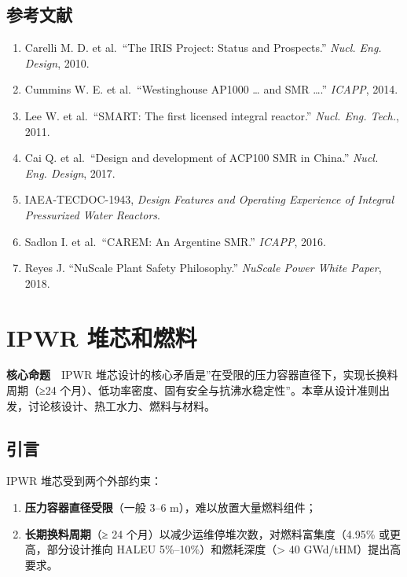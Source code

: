 \documentclass[
  UTF8,
  scheme=plain,
  fontsize=10pt,
  openany
]{ctexbook}
\begin{document}
\section{参考文献}\label{ux53c2ux8003ux6587ux732e-2}

\begin{enumerate}
\def\labelenumi{\arabic{enumi}.}
\tightlist
\item
  Carelli M. D. et al.~``The IRIS Project: Status and Prospects.''
  \emph{Nucl. Eng. Design}, 2010.
\item
  Cummins W. E. et al.~``Westinghouse AP1000 \ldots{} and SMR \ldots.''
  \emph{ICAPP}, 2014.
\item
  Lee W. et al.~``SMART: The first licensed integral reactor.''
  \emph{Nucl. Eng. Tech.}, 2011.
\item
  Cai Q. et al.~``Design and development of ACP100 SMR in China.''
  \emph{Nucl. Eng. Design}, 2017.
\item
  IAEA-TECDOC-1943, \emph{Design Features and Operating Experience of
  Integral Pressurized Water Reactors}.
\item
  Sadlon I. et al.~``CAREM: An Argentine SMR.'' \emph{ICAPP}, 2016.
\item
  Reyes J. ``NuScale Plant Safety Philosophy.'' \emph{NuScale Power
  White Paper}, 2018.
\end{enumerate}

\cleardoublepage

\chapter{IPWR 堆芯和燃料}\label{ipwr-ux5806ux82afux548cux71c3ux6599}

\begin{epigraph}

\textbf{核心命题}　IPWR
堆芯设计的核心矛盾是''在受限的压力容器直径下，实现长换料周期（≥24
个月）、低功率密度、固有安全与抗沸水稳定性''。本章从设计准则出发，讨论核设计、热工水力、燃料与材料。

\end{epigraph}

\section{引言}\label{ux5f15ux8a00-3}

IPWR 堆芯受到两个外部约束：

\begin{enumerate}
\def\labelenumi{\arabic{enumi}.}
\tightlist
\item
  \textbf{压力容器直径受限}（一般 3--6 m），难以放置大量燃料组件；
\item
  \textbf{长期换料周期}（≥ 24
  个月）以减少运维停堆次数，对燃料富集度（4.95\% 或更高，部分设计推向
  HALEU 5\%--10\%）和燃耗深度（\textgreater{} 40 GWd/tHM）提出高要求。
\end{enumerate}
\end{document}
